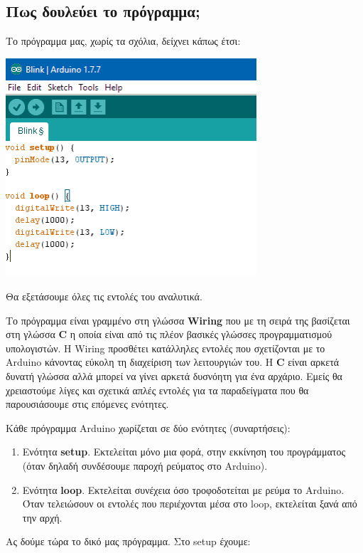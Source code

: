 \documentclass[a4paper,twoside,12pt]{article}
\begin{document}
\subsection{Πως δουλεύει το πρόγραμμα;}
Το πρόγραμμα μας, χωρίς τα σχόλια, δείχνει κάπως έτσι:

\begin{center}
  \includegraphics[width=0.7\textwidth]{images/main/first-program}
\end{center}

Θα εξετάσουμε όλες τις εντολές του αναλυτικά.

Το πρόγραμμα είναι γραμμένο στη γλώσσα \textbf{Wiring} που με τη σειρά της βασίζεται στη γλώσσα \textbf{C} η οποία είναι από τις πλέον βασικές γλώσσες προγραμματισμού υπολογιστών. Η Wiring προσθέτει κατάλληλες εντολές που σχετίζονται με το Arduino κάνοντας εύκολη τη διαχείριση των λειτουργιών του. Η \textbf{C} είναι αρκετά δυνατή γλώσσα αλλά μπορεί να γίνει αρκετά δυσνόητη για ένα αρχάριο. Εμείς θα χρειαστούμε λίγες και σχετικά απλές εντολές για τα παραδείγματα που θα παρουσιάσουμε στις επόμενες ενότητες.

Κάθε πρόγραμμα Arduino χωρίζεται σε δύο ενότητες (συναρτήσεις):

\begin{enumerate}
\item Ενότητα \textbf{setup}. Εκτελείται μόνο μια φορά, στην εκκίνηση του προγράμματος (όταν δηλαδή συνδέσουμε παροχή ρεύματος στο Arduino).
\item Ενότητα \textbf{loop}. Εκτελείται συνέχεια όσο τροφοδοτείται με ρεύμα το Arduino. Όταν τελειώσουν οι εντολές που περιέχονται μέσα στο loop, εκτελείται ξανά από την αρχή.
\end{enumerate}

Ας δούμε τώρα το δικό μας πρόγραμμα. Στο setup έχουμε:
\end{document}
